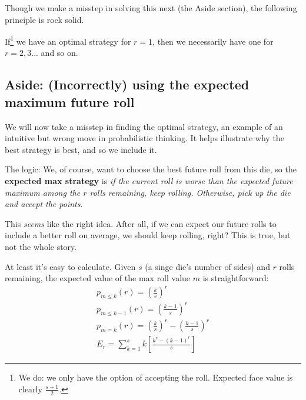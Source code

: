 \documentclass[11pt, oneside]{article} 	%
\begin{document}
Though we make a misstep in solving this next (the Aside section), the following principle is rock solid.


If\footnote{We do: we only have the option of accepting the roll.  Expected face value is clearly $\frac{s+1}{2}$.} we have an optimal strategy for $r=1$, then we necessarily have one for $r=2, 3... $ and so on.

\subsection{Aside: (Incorrectly) using the expected maximum future roll}

We will now take a misstep in finding the optimal strategy, an example of an intuitive but wrong move in probabilistic thinking.  It helps illustrate why the best strategy is best, and so we include it.

The logic: We, of course, want to choose the best future roll from this die, so the \textbf{expected max strategy} is \emph{if the current roll is worse than the expected future maximum among the $r$ rolls remaining, keep rolling. Otherwise, pick up the die and accept the points}.

This \emph{seems} like the right idea.  After all, if we can expect our future rolls to include a better roll on average, we should keep rolling, right?  This is true, but not the whole story.  

At least it's easy to calculate.  Given $s$ (a singe die's number of sides) and $r$ rolls remaining, the expected value of the max roll value $m$ is straightforward:
\begin{align}
p_{m \leq k}(r) =  (\frac{k}{s})^r \\
p_{m \leq k-1}(r) =  (\frac{k-1}{s})^r \\
p_{m = k}(r) =  (\frac{k}{s})^r - (\frac{k-1}{s})^r \\
E_r = \sum_{k=1}^s k[\frac{k^r - (k-1)^r}{s}]
\end{align}
\end{document}
